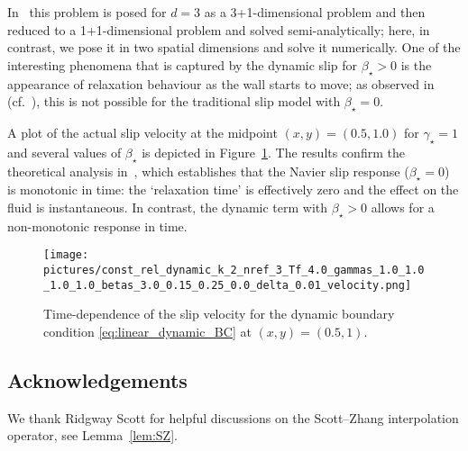 \documentclass[reqno,a4paper]{amsart}
\begin{document}
	In~\cite{Abbatiello2021} this problem is posed for $d = 3$ as a 3+1-dimensional problem and then reduced to a 1+1-dimensional problem and solved semi-analytically; 
	here, in contrast, we pose it in two spatial dimensions and solve it numerically. 
	One of the interesting phenomena that is captured by the dynamic slip for $\beta_\star >0$ is the appearance of relaxation behaviour as the wall starts to move; as observed in~\cite{Abbatiello2021} (cf.~\cite{Hatzikiriakos2012}), this is not possible for the traditional slip model with $\beta_\star=0$. 
	
	A plot of the actual slip velocity at the midpoint $(x,y)=(0.5,1.0)$ for $\gamma_\star=1$ and several values of $\beta_\star$ is depicted in Figure~\ref{fig:dynamic_slip}. 
	The results confirm the theoretical analysis in~\cite{Abbatiello2021}, which establishes that the Navier slip response ($\beta_\star = 0$) is monotonic in time: 
	the `relaxation time' is effectively zero and the effect on the fluid is instantaneous. 
	In contrast, the dynamic term with $\beta_\star>0$ allows for a non-monotonic response in time. 
	
	
	\begin{figure}
		\centering
		\texttt{[image: pictures/const\_rel\_dynamic\_k\_2\_nref\_3\_Tf\_4.0\_gammas\_1.0\_1.0\_1.0\_1.0\_betas\_3.0\_0.15\_0.25\_0.0\_delta\_0.01\_velocity.png]}
		\caption{Time-dependence of the slip velocity for the dynamic boundary condition \eqref{eq:linear_dynamic_BC} at $(x,y)=(0.5,1)$.}%
		\label{fig:dynamic_slip}
	\end{figure}
	
	\subsection*{Acknowledgements} 
	We thank Ridgway Scott for helpful discussions on the Scott--Zhang interpolation operator, see Lemma~\ref{lem:SZ}.
	
	
	\printbibliography
	
	
	
\end{document}
